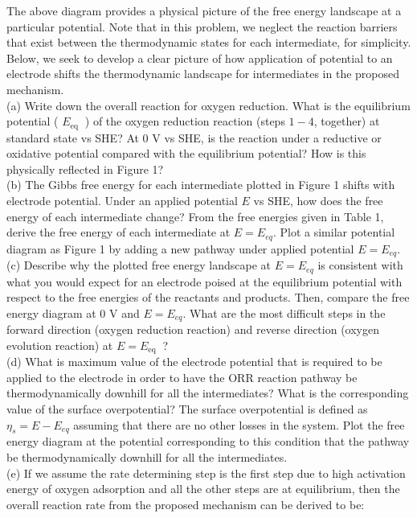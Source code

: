 \documentclass[12pt]{article}
\begin{document}
The above diagram provides a physical picture of the free energy landscape at a particular potential. Note that in this problem, we neglect the reaction barriers that exist between the thermodynamic states for each intermediate, for simplicity. Below, we seek to develop a clear picture of how application of potential to an electrode shifts the thermodynamic landscape for intermediates in the proposed mechanism.\\
(a) Write down the overall reaction for oxygen reduction. What is the equilibrium potential ( $E_{\text {eq }}$ ) of the oxygen reduction reaction (steps $1-4$, together) at standard state vs SHE? At 0 V vs SHE, is the reaction under a reductive or oxidative potential compared with the equilibrium potential? How is this physically reflected in Figure 1?\\
(b) The Gibbs free energy for each intermediate plotted in Figure 1 shifts with electrode potential. Under an applied potential $E$ vs SHE, how does the free energy of each intermediate change? From the free energies given in Table 1, derive the free energy of each intermediate at $E=E_{e q}$. Plot a similar potential diagram as Figure 1 by adding a new pathway under applied potential $E=E_{e q}$.\\
(c) Describe why the plotted free energy landscape at $E=E_{e q}$ is consistent with what you would expect for an electrode poised at the equilibrium potential with respect to the free energies of the reactants and products. Then, compare the free energy diagram at 0 V and $E=E_{e q}$. What are the most difficult steps in the forward direction (oxygen reduction reaction) and reverse direction (oxygen evolution reaction) at $E=E_{\text {eq }}$ ?\\
(d) What is maximum value of the electrode potential that is required to be applied to the electrode in order to have the ORR reaction pathway be thermodynamically downhill for all the intermediates? What is the corresponding value of the surface overpotential? The surface overpotential is defined as $\eta_{s}=E-E_{e q}$ assuming that there are no other losses in the system. Plot the free energy diagram at the potential corresponding to this condition that the pathway be thermodynamically downhill for all the intermediates.\\
(e) If we assume the rate determining step is the first step due to high activation energy of oxygen adsorption and all the other steps are at equilibrium, then the overall reaction rate from the proposed mechanism can be derived to be:
\end{document}
